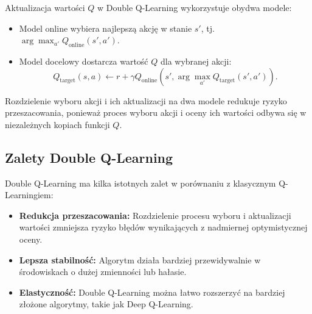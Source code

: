 Aktualizacja wartości \(Q\) w Double Q-Learning wykorzystuje obydwa modele:
\begin{itemize}
	\item Model online wybiera najlepszą akcję w stanie \(s'\), tj. \(\arg\max_{a'} Q_\text{online}(s', a')\).
	\item Model docelowy dostarcza wartość \(Q\) dla wybranej akcji:
	      \[
		      Q_\text{target}(s, a) \leftarrow r + \gamma Q_\text{online}(s', \arg\max_{a'} Q_\text{target}(s', a')).
	      \]
\end{itemize}

Rozdzielenie wyboru akcji i ich aktualizacji na dwa modele redukuje ryzyko przeszacowania, ponieważ proces wyboru akcji i oceny ich wartości odbywa się w niezależnych kopiach funkcji \(Q\).

\subsection{Zalety Double Q-Learning}

Double Q-Learning ma kilka istotnych zalet w porównaniu z klasycznym Q-Learningiem:
\begin{itemize}
	\item \textbf{Redukcja przeszacowania:} Rozdzielenie procesu wyboru i aktualizacji wartości zmniejsza ryzyko błędów wynikających z nadmiernej optymistycznej oceny.
	\item \textbf{Lepsza stabilność:} Algorytm działa bardziej przewidywalnie w środowiskach o dużej zmienności lub hałasie.
	\item \textbf{Elastyczność:} Double Q-Learning można łatwo rozszerzyć na bardziej złożone algorytmy, takie jak Deep Q-Learning.
\end{itemize}
